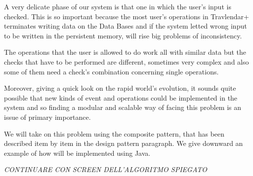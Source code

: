 A very delicate phase of our system is that one in which the user's input is checked. This is so important because the most user’s operations in Travlendar+ terminates writing data on the Data Bases and if the system letted wrong input to be written in the persistent memory, will rise big problems of inconsistency.

The operations that the user is allowed to do work all with similar data but the checks that have to be performed are different, sometimes very complex and also some of them need a check’s combination concerning single operations.

Moreover, giving a quick look on the rapid world’s evolution, it sounds quite possible that new kinds of event and operations could be implemented in the system and so finding a modular and scalable way of facing this problem is an issue of primary importance.

We will take on this problem using the composite pattern, that has been described item by item in the design pattern paragraph. We give downward an example of how will be implemented using Java.


\emph{ \huge CONTINUARE CON SCREEN DELL'ALGORITMO SPIEGATO}